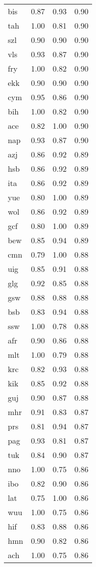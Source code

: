 \begin{table}
\begin{tabular}{lrrr}
bis & 0.87 & 0.93 & 0.90 \\
tah & 1.00 & 0.81 & 0.90 \\
szl & 0.90 & 0.90 & 0.90 \\
vls & 0.93 & 0.87 & 0.90 \\
fry & 1.00 & 0.82 & 0.90 \\
ekk & 0.90 & 0.90 & 0.90 \\
cym & 0.95 & 0.86 & 0.90 \\
bih & 1.00 & 0.82 & 0.90 \\
ace & 0.82 & 1.00 & 0.90 \\
nap & 0.93 & 0.87 & 0.90 \\
azj & 0.86 & 0.92 & 0.89 \\
hsb & 0.86 & 0.92 & 0.89 \\
ita & 0.86 & 0.92 & 0.89 \\
yue & 0.80 & 1.00 & 0.89 \\
wol & 0.86 & 0.92 & 0.89 \\
gcf & 0.80 & 1.00 & 0.89 \\
bew & 0.85 & 0.94 & 0.89 \\
cmn & 0.79 & 1.00 & 0.88 \\
uig & 0.85 & 0.91 & 0.88 \\
glg & 0.92 & 0.85 & 0.88 \\
gsw & 0.88 & 0.88 & 0.88 \\
bsb & 0.83 & 0.94 & 0.88 \\
ssw & 1.00 & 0.78 & 0.88 \\
afr & 0.90 & 0.86 & 0.88 \\
mlt & 1.00 & 0.79 & 0.88 \\
krc & 0.82 & 0.93 & 0.88 \\
kik & 0.85 & 0.92 & 0.88 \\
guj & 0.90 & 0.87 & 0.88 \\
mhr & 0.91 & 0.83 & 0.87 \\
prs & 0.81 & 0.94 & 0.87 \\
pag & 0.93 & 0.81 & 0.87 \\
tuk & 0.84 & 0.90 & 0.87 \\
nno & 1.00 & 0.75 & 0.86 \\
ibo & 0.82 & 0.90 & 0.86 \\
lat & 0.75 & 1.00 & 0.86 \\
wuu & 1.00 & 0.75 & 0.86 \\
hif & 0.83 & 0.88 & 0.86 \\
hmn & 0.90 & 0.82 & 0.86 \\
ach & 1.00 & 0.75 & 0.86 \\

\end{tabular}
\end{table}
